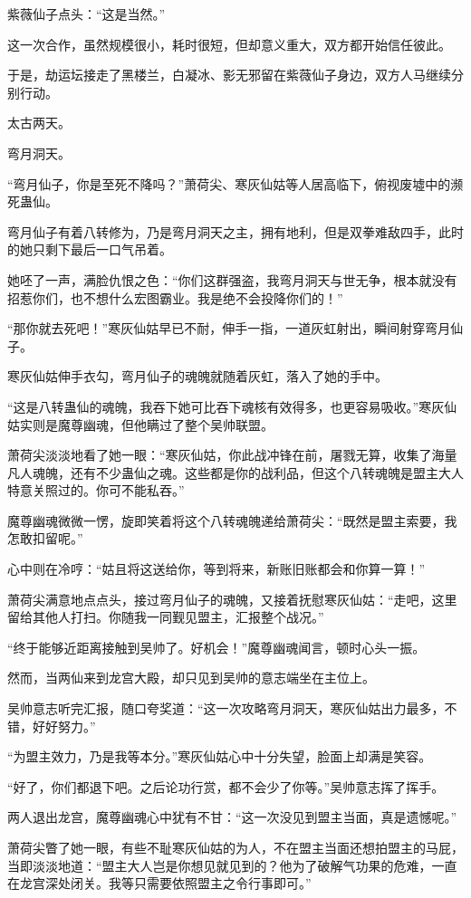 \begin{this_body}
紫薇仙子点头：“这是当然。”

这一次合作，虽然规模很小，耗时很短，但却意义重大，双方都开始信任彼此。

于是，劫运坛接走了黑楼兰，白凝冰、影无邪留在紫薇仙子身边，双方人马继续分别行动。

太古两天。

弯月洞天。

“弯月仙子，你是至死不降吗？”萧荷尖、寒灰仙姑等人居高临下，俯视废墟中的濒死蛊仙。

弯月仙子有着八转修为，乃是弯月洞天之主，拥有地利，但是双拳难敌四手，此时的她只剩下最后一口气吊着。

她呸了一声，满脸仇恨之色：“你们这群强盗，我弯月洞天与世无争，根本就没有招惹你们，也不想什么宏图霸业。我是绝不会投降你们的！”

“那你就去死吧！”寒灰仙姑早已不耐，伸手一指，一道灰虹射出，瞬间射穿弯月仙子。

寒灰仙姑伸手衣勾，弯月仙子的魂魄就随着灰虹，落入了她的手中。

“这是八转蛊仙的魂魄，我吞下她可比吞下魂核有效得多，也更容易吸收。”寒灰仙姑实则是魔尊幽魂，但他瞒过了整个吴帅联盟。

萧荷尖淡淡地看了她一眼：“寒灰仙姑，你此战冲锋在前，屠戮无算，收集了海量凡人魂魄，还有不少蛊仙之魂。这些都是你的战利品，但这个八转魂魄是盟主大人特意关照过的。你可不能私吞。”

魔尊幽魂微微一愣，旋即笑着将这个八转魂魄递给萧荷尖：“既然是盟主索要，我怎敢扣留呢。”

心中则在冷哼：“姑且将这送给你，等到将来，新账旧账都会和你算一算！”

萧荷尖满意地点点头，接过弯月仙子的魂魄，又接着抚慰寒灰仙姑：“走吧，这里留给其他人打扫。你随我一同觐见盟主，汇报整个战况。”

“终于能够近距离接触到吴帅了。好机会！”魔尊幽魂闻言，顿时心头一振。

然而，当两仙来到龙宫大殿，却只见到吴帅的意志端坐在主位上。

吴帅意志听完汇报，随口夸奖道：“这一次攻略弯月洞天，寒灰仙姑出力最多，不错，好好努力。”

“为盟主效力，乃是我等本分。”寒灰仙姑心中十分失望，脸面上却满是笑容。

“好了，你们都退下吧。之后论功行赏，都不会少了你等。”吴帅意志挥了挥手。

两人退出龙宫，魔尊幽魂心中犹有不甘：“这一次没见到盟主当面，真是遗憾呢。”

萧荷尖瞥了她一眼，有些不耻寒灰仙姑的为人，不在盟主当面还想拍盟主的马屁，当即淡淡地道：“盟主大人岂是你想见就见到的？他为了破解气功果的危难，一直在龙宫深处闭关。我等只需要依照盟主之令行事即可。”


\end{this_body}
